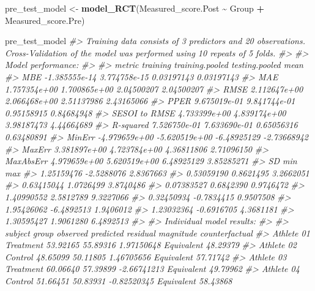 \documentclass[
]{book}
\newenvironment{Shaded}{\begin{snugshade}}{\end{snugshade}}
\newcommand{\CommentTok}[1]{\textcolor[rgb]{0.56,0.35,0.01}{\textit{#1}}}
\newcommand{\KeywordTok}[1]{\textcolor[rgb]{0.13,0.29,0.53}{\textbf{#1}}}
\newcommand{\NormalTok}[1]{#1}
\newcommand{\OperatorTok}[1]{\textcolor[rgb]{0.81,0.36,0.00}{\textbf{#1}}}
\newcommand{\StringTok}[1]{\textcolor[rgb]{0.31,0.60,0.02}{#1}}
\begin{document}
\begin{Shaded}
\begin{Highlighting}[]
\NormalTok{pre\_test\_model <{-}}\StringTok{ }\KeywordTok{model\_RCT}\NormalTok{(Measured\_score.Post }\OperatorTok{\textasciitilde{}}\StringTok{ }\NormalTok{Group }\OperatorTok{+}\StringTok{ }\NormalTok{Measured\_score.Pre)}

\NormalTok{pre\_test\_model}
\CommentTok{\#> Training data consists of 3 predictors and 20 observations. Cross{-}Validation of the model was performed using 10 repeats of 5 folds.}
\CommentTok{\#> }
\CommentTok{\#> Model performance:}
\CommentTok{\#> }
\CommentTok{\#>         metric      training training.pooled testing.pooled        mean}
\CommentTok{\#>            MBE {-}1.385555e{-}14    3.774758e{-}15     0.03197143  0.03197143}
\CommentTok{\#>            MAE  1.757354e+00    1.700865e+00     2.04500207  2.04500207}
\CommentTok{\#>           RMSE  2.112647e+00    2.066468e+00     2.51137986  2.43165066}
\CommentTok{\#>           PPER  9.675019e{-}01    9.841744e{-}01     0.95158915  0.84684948}
\CommentTok{\#>  SESOI to RMSE  4.733399e+00    4.839174e+00     3.98187473  4.44664689}
\CommentTok{\#>      R{-}squared  7.526750e{-}01    7.633690e{-}01     0.65056316  0.63480891}
\CommentTok{\#>         MinErr {-}4.979659e+00   {-}5.620519e+00    {-}6.48925129 {-}2.73668942}
\CommentTok{\#>         MaxErr  3.381897e+00    4.723784e+00     4.36811806  2.71096150}
\CommentTok{\#>      MaxAbsErr  4.979659e+00    5.620519e+00     6.48925129  3.85285271}
\CommentTok{\#>          SD        min       max}
\CommentTok{\#>  1.25159476 {-}2.5288076 2.8367663}
\CommentTok{\#>  0.53059190  0.8621495 3.2662051}
\CommentTok{\#>  0.63415044  1.0726499 3.8740486}
\CommentTok{\#>  0.07383527  0.6842390 0.9746472}
\CommentTok{\#>  1.40990552  2.5812789 9.3227066}
\CommentTok{\#>  0.32450934 {-}0.7834415 0.9507508}
\CommentTok{\#>  1.95426062 {-}6.4892513 1.9406012}
\CommentTok{\#>  1.23032364 {-}0.6916705 4.3681181}
\CommentTok{\#>  1.30595427  1.9061280 6.4892513}
\CommentTok{\#> }
\CommentTok{\#> Individual model results:}
\CommentTok{\#> }
\CommentTok{\#>     subject     group observed predicted    residual  magnitude counterfactual}
\CommentTok{\#>  Athlete 01 Treatment 53.92165  55.89316  1.97150648 Equivalent       48.29379}
\CommentTok{\#>  Athlete 02   Control 48.65099  50.11805  1.46705656 Equivalent       57.71742}
\CommentTok{\#>  Athlete 03 Treatment 60.06640  57.39899 {-}2.66741213 Equivalent       49.79962}
\CommentTok{\#>  Athlete 04   Control 51.66451  50.83931 {-}0.82520345 Equivalent       58.43868}

\end{Highlighting}
\end{Shaded}
\end{document}
